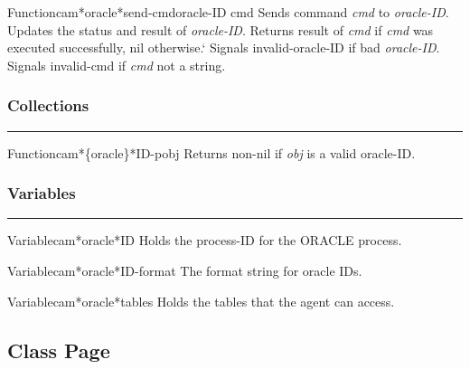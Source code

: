 \begin{functiondoc}{Function}{cam*oracle*send-cmd}{oracle-ID cmd}
Sends command {\em cmd} to {\em oracle-ID}.  Updates the status and result of {\em oracle-ID}.
Returns result of {\em cmd} if {\em cmd} was executed successfully, nil otherwise.`
Signals invalid-oracle-ID if bad {\em oracle-ID}.
Signals invalid-cmd if {\em cmd} not a string.
\end{functiondoc}


\subsubsection*{Collections}
\par\vspace*{0.00in}\par\hrule\par\medskip\par


\begin{functiondoc}{Function}{cam*\{oracle\}*ID-p}{obj}
Returns non-nil if {\em obj} is a valid oracle-ID.
\end{functiondoc}


\subsubsection*{Variables}
\par\vspace*{0.00in}\par\hrule\par\medskip\par


\begin{functiondoc}{Variable}{cam*oracle*ID}{}
Holds the process-ID for the ORACLE process.
\end{functiondoc}

\begin{functiondoc}{Variable}{cam*oracle*ID-format}{}
The format string for oracle IDs.
\end{functiondoc}

\begin{functiondoc}{Variable}{cam*oracle*tables}{}
Holds the tables that the agent can access.
\end{functiondoc}


\clearpage

\subsection{Class Page}

